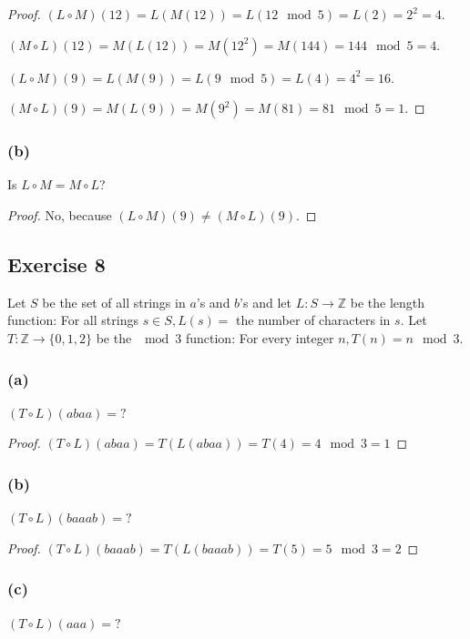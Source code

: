 \documentclass[14pt]{extarticle}
\newcommand{\Z}{\mathbb{Z}}
\begin{document}
\begin{proof}
\((L \circ M)(12) = L(M(12)) = L(12 \mod 5) = L(2) = 2^2 = 4\).

\((M \circ L)(12) = M(L(12)) = M(12^2) = M(144) = 144 \mod 5 = 4\).

\((L \circ M)(9) = L(M(9)) = L(9 \mod 5) = L(4) = 4^2 = 16\).

\((M \circ L)(9) = M(L(9)) = M(9^2) = M(81) = 81 \mod 5 = 1\).
\end{proof}

\subsubsection{(b)}
Is \(L \circ M = M \circ L\)?

\begin{proof}
No, because \((L \circ M)(9) \neq (M \circ L)(9)\).
\end{proof}

\subsection{Exercise 8}
Let $S$ be the set of all strings in $a$’s and $b$’s and let \(L: S \to \Z\) be the length function: For all strings 
\(s \in S, L(s) =\) the number of characters in $s$. Let \(T: \Z \to \{0, 1, 2\}\) be the $\mod 3$ function: For 
every integer \(n, T(n) = n \mod 3\).

\subsubsection{(a)}
\((T \circ L)(abaa) = ?\)

\begin{proof}
\((T \circ L)(abaa) = T(L(abaa)) = T(4) = 4 \mod 3 = 1\)
\end{proof}

\subsubsection{(b)}
\((T \circ L)(baaab) = ?\)

\begin{proof}
\((T \circ L)(baaab) = T(L(baaab)) = T(5) = 5 \mod 3 = 2\)
\end{proof}

\subsubsection{(c)}
\((T \circ L)(aaa) = ?\)
\end{document}
